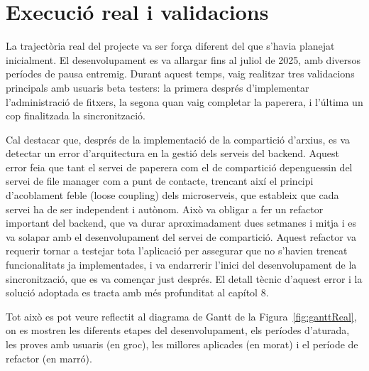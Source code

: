 \section{Execució real i validacions}

La trajectòria real del projecte va ser força diferent del que s'havia planejat inicialment. El desenvolupament es va allargar fins al juliol de 2025, amb diversos períodes de pausa entremig. Durant aquest temps, vaig realitzar tres validacions principals amb usuaris beta testers: la primera després d'implementar l'administració de fitxers, la segona quan vaig completar la paperera, i l'última un cop finalitzada la sincronització. 

Cal destacar que, després de la implementació de la compartició d'arxius, es va detectar un error d'arquitectura en la gestió dels serveis del backend. Aquest error feia que tant el servei de paperera com el de compartició depenguessin del servei de file manager com a punt de contacte, trencant així el principi d'acoblament feble (loose coupling) dels microserveis, que estableix que cada servei ha de ser independent i autònom. Això va obligar a fer un refactor important del backend, que va durar aproximadament dues setmanes i mitja i es va solapar amb el desenvolupament del servei de compartició. Aquest refactor va requerir tornar a testejar tota l'aplicació per assegurar que no s'havien trencat funcionalitats ja implementades, i va endarrerir l'inici del desenvolupament de la sincronització, que es va començar just després. El detall tècnic d'aquest error i la solució adoptada es tracta amb més profunditat al capítol 8.

Tot això es pot veure reflectit al diagrama de Gantt de la Figura~\ref{fig:ganttReal}, on es mostren les diferents etapes del desenvolupament, els períodes d'aturada, les proves amb usuaris (en groc), les millores aplicades (en morat) i el període de refactor (en marró).

